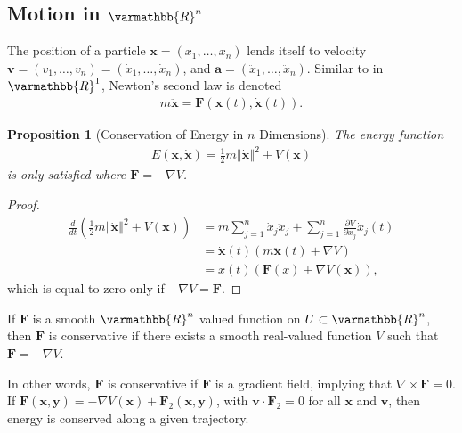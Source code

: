 \documentclass[12pt]{extarticle}
\newcommand{\R}{\varmathbb{R}}
\newcommand{\norm}[1]{\left\Vert #1\right\Vert}
\theoremstyle{plain}
\newtheorem*{proposition}{Proposition}%
\theoremstyle{definition}
\theoremstyle{remark}
\renewcommand{\newline}{\hfill\break}
\begin{document}
  \subsection{Motion in $\R^n$}%
  The position of a particle $\mathbf{x} = (x_1,\dots,x_n)$ lends itself to velocity $\mathbf{v} = (v_1,\dots,v_n) = (\dot{x}_1,\dots,\dot{x}_n)$, and $\mathbf{a} = (\ddot{x}_1,\dots,\ddot{x}_n)$. Similar to in $\R^1$, Newton's second law is denoted
  \begin{align*}
    m\mathbf{\ddot{x}} = \mathbf{F}(\mathbf{x}(t),\mathbf{\dot{x}}(t)).
  \end{align*}
  \begin{proposition}[Conservation of Energy in $n$ Dimensions]
    The energy function
    \begin{align*}
      E(\mathbf{x},\mathbf{\dot{x}}) = \frac{1}{2}m\norm{\mathbf{\dot{x}}}^2 + V(\mathbf{x})
    \end{align*}
    is only satisfied where $\mathbf{F} = -\nabla V$.
  \end{proposition}
  \begin{proof}
      \begin{align*}
        \frac{d}{dt}\left(\frac{1}{2}m\norm{\mathbf{\dot{x}}}^2 + V(\mathbf{x})\right) &= m\sum_{j=1}^{n}\dot{x}_j\ddot{x}_j + \sum_{j=1}^{n}\frac{\partial V}{\partial x_j}\dot{x}_j(t)\\
                                                                                 &= \mathbf{\dot{x}}(t)\left(m\mathbf{\ddot{x}}(t) + \nabla V\right)\\
                                                                                 &= \dot{x}(t)\left(\mathbf{F}(x) + \nabla V(\mathbf{x})\right),
      \end{align*}
      which is equal to zero only if $-\nabla V = \mathbf{F}$.
  \end{proof}
  If $\mathbf{F}$ is a smooth $\R^n$ valued function on $U\subset \R^n$, then $\mathbf{F}$ is conservative if there exists a smooth real-valued function $V$ such that $\mathbf{F} = -\nabla V$.\newline

  In other words, $\mathbf{F}$ is conservative if $\mathbf{F}$ is a gradient field, implying that $\nabla \times \mathbf{F} = 0$.\\

  If $\mathbf{F}(\mathbf{x},\mathbf{y}) = -\nabla V(\mathbf{x}) + \mathbf{F}_{2}(\mathbf{x},\mathbf{y})$, with $\mathbf{v}\cdot \mathbf{F}_{2} = 0$ for all $\mathbf{x}$ and $\mathbf{v}$, then energy is conserved along a given trajectory.
\end{document}

